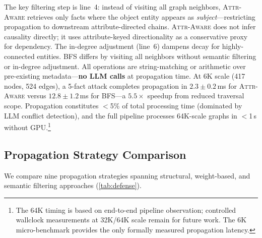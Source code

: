 \documentclass{article}
\newcommand{\attraware}{\textsc{Attr-Aware}}
\newcommand{\bfsprop}{\textsc{BFS}}
\begin{document}
The key filtering step is line~4: instead of visiting all graph neighbors, \attraware{} retrieves only facts where the object entity appears as \textit{subject}---restricting propagation to downstream attribute-directed chains.
\attraware{} does not infer causality directly; it uses attribute-keyed directionality as a conservative proxy for dependency.
The in-degree adjustment (line~6) dampens decay for highly-connected entities.
\bfsprop{} differs by visiting all neighbors without semantic filtering or in-degree adjustment.
All operations are string-matching or arithmetic over pre-existing metadata---\textbf{no LLM calls} at propagation time.
At 6K scale (417 nodes, 524 edges), a 5-fact attack completes propagation in $2.3\pm0.2$\,ms for \attraware{} versus $12.8\pm1.2$\,ms for BFS---a $5.5\times$ speedup from reduced traversal scope.
Propagation constitutes $<$5\% of total processing time (dominated by LLM conflict detection), and the full pipeline processes 64K-scale graphs in $<$1\,s without GPU.\footnote{The 64K timing is based on end-to-end pipeline observation; controlled wallclock measurements at 32K/64K scale remain for future work.  The 6K micro-benchmark provides the only formally measured propagation latency.}

\subsection{Propagation Strategy Comparison}

We compare nine propagation strategies spanning structural, weight-based, and semantic filtering approaches (\cref{tab:defense}).
\end{document}
